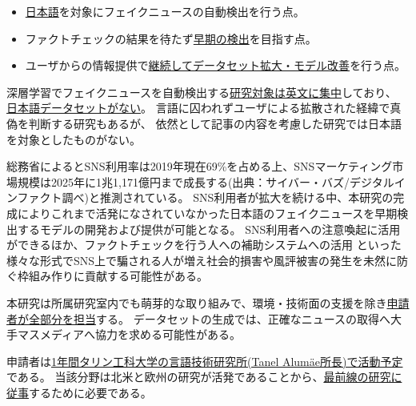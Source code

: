 
\vspace{20pt}
\begin{itemize}
    \setlength{\parskip}{0cm}
    \setlength{\itemsep}{0cm}
    \item \underline{日本語}を対象にフェイクニュースの自動検出を行う点。
    \item ファクトチェックの結果を待たず\underline{早期の検出}を目指す点。
    \item ユーザからの情報提供で\underline{継続してデータセット拡大・モデル改善}を行う点。
\end{itemize}

深層学習でフェイクニュースを自動検出する\underline{研究対象は英文に集中}しており、
\underline{日本語データセットがない}。
言語に囚われずユーザによる拡散された経緯で真偽を判断する研究もあるが\cite{tarek2020}、
依然として記事の内容を考慮した研究では日本語を対象としたものがない。

総務省によるとSNS利用率は2019年現在69\%を占める上、SNSマーケティング市場規模は2025年に1兆1,171億円まで成長する(出典：サイバー・バズ/デジタルインファクト調べ)と推測されている。
SNS利用者が拡大を続ける中、本研究の完成によりこれまで活発になされていなかった日本語のフェイクニュースを早期検出するモデルの開発および提供が可能となる。
SNS利用者への注意喚起に活用ができるほか、ファクトチェックを行う人への補助システムへの活用
といった様々な形式でSNS上で騙される人が増え社会的損害や風評被害の発生を未然に防ぐ枠組み作りに貢献する可能性がある。


本研究は所属研究室内でも萌芽的な取り組みで、環境・技術面の支援を除き\underline{申請者が全部分を担当}する。
データセットの生成では、正確なニュースの取得へ大手マスメディアへ協力を求める可能性がある。

申請者は\underline{1年間タリン工科大学の言語技術研究所(Tanel Alumäe所長)で活動予定}である。
当該分野は北米と欧州の研究が活発であることから、\underline{最前線の研究に従事}するために必要である。


